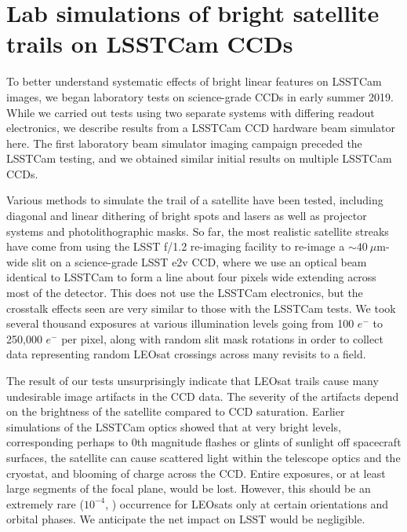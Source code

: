 \documentclass[twocolumn,trackchanges]{aastex63}
\begin{document}
\bigskip

\section{Lab simulations of bright satellite trails on LSSTCam CCDs}
\label{sec:lab-trail-sim}

To better understand systematic effects of bright linear features on LSSTCam images, we began laboratory tests on science-grade CCDs in early summer 2019. While we carried out tests using two separate systems with differing readout electronics, we describe results from a LSSTCam CCD hardware beam simulator here. The first laboratory beam simulator imaging campaign preceded the LSSTCam testing, and we obtained similar initial results on multiple LSSTCam CCDs.

Various methods to simulate the trail of a satellite have been tested, including diagonal and linear dithering of bright spots and lasers as well as projector systems and photolithographic masks. So far, the most realistic satellite streaks have come from using the LSST f/1.2 re-imaging facility \citep{2014SPIE.9154E..15T} to re-image a $\sim40~\mu$m-wide slit on a science-grade LSST e2v CCD, where we use an optical beam identical to LSSTCam to form a line about four pixels wide extending across most of the detector. This does not use the LSSTCam electronics, but the crosstalk effects seen are very similar to those with the LSSTCam tests. We took several thousand exposures at various illumination levels going from 100 $e^-$ to 250,000 $e^-$ per pixel, along with random slit mask rotations in order to collect data representing random LEOsat crossings across many revisits to a field.

The result of our tests unsurprisingly indicate that LEOsat trails cause many undesirable image artifacts in the CCD data. The severity of the artifacts depend on the brightness of the satellite compared to CCD saturation. Earlier simulations of the LSSTCam optics showed that at very bright levels, corresponding perhaps to 0th magnitude flashes or glints of sunlight off spacecraft surfaces, the satellite can cause scattered light within the telescope optics and the cryostat, and blooming of charge across the CCD. Entire exposures, or at least large segments of the focal plane, would be lost. However, this should be an extremely rare ($10^{-4}$, \citealt{2020A&A...636A.121H}) occurrence for LEOsats only at certain orientations and orbital phases. We anticipate the net impact on LSST would be negligible.
\end{document}
